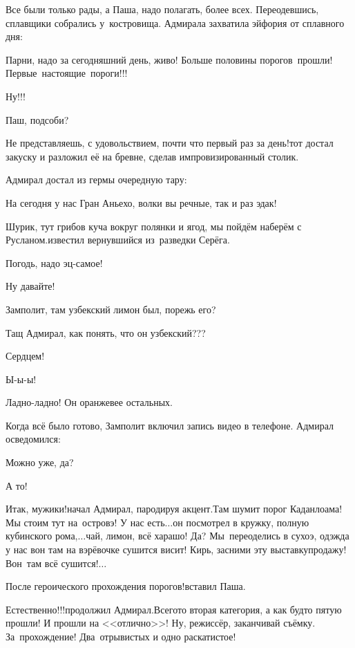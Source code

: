Все были только рады, а Паша, надо полагать, более всех. Переодевшись, сплавщики собрались у~костровища. Адмирала захватила эйфория от сплавного дня:

\diagdash Парни, надо за сегодняшний день, живо! Больше половины порогов~прошли! Первые~настоящие~пороги!!!%

\diagdash Ну!!!

\diagdash Паш, подсоби?

\diagdash Не представляешь, с удовольствием, почти что первый раз за день!\mdash тот достал закуску и разложил её на бревне, сделав импровизированный столик.

Адмирал достал из гермы очередную тару:

\diagdash На сегодня у нас Гран Аньехо, волки вы речные, так и раз эдак!

\diagdash Шурик, тут грибов куча вокруг полянки и ягод, мы пойдём наберём с Русланом.\mdash известил вернувшийся из~разведки Серёга.

\diagdash Погодь, надо эц-самое!

\diagdash Ну давайте!

\diagdash Замполит, там узбекский лимон был, порежь его?

\diagdash Тащ Адмирал, как понять, что он узбекский???

\diagdash Сердцем!

\diagdash Ы-ы-ы!

\diagdash Ладно-ладно! Он оранжевее остальных.

Когда всё было готово, Замполит включил запись видео в телефоне. Адмирал осведомился:

\diagdash Можно уже, да?

\diagdash А то!

\diagdash Итак, мужики!\mdash начал Адмирал, пародируя акцент.\mdash Там шумит порог Каданлоама! Мы стоим тут на~островэ! У нас есть$\ldots$\mdash он посмотрел в кружку, полную кубинского рома,\mdash $\ldots$чай, лимон, всё харашо! Да? Мы~переоделись в сухоэ, одэжда у нас вон там на вэрёвочке сушится висит! Кирь, засними эту выставку\sdash продажу! Вон~там всё сушится!$\ldots$

\diagdash После героического прохождения порогов!\mdash вставил Паша.

\diagdash Естественно!!!\mdash продолжил Адмирал.\mdash Всего\sdash то вторая категория, а как будто пятую прошли! И прошли на <<отлично>>! Ну, режиссёр, заканчивай съёмку. За~прохождение! Два~отрывистых и одно раскатистое!

